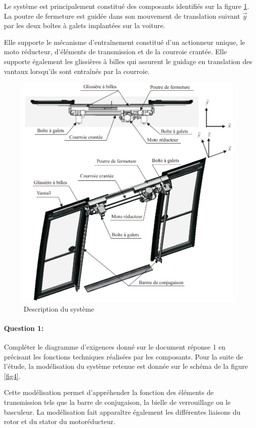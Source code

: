 Le système est principalement constitué des composants identifiés sur la figure \ref{fig3}. La poutre de fermeture est guidée dans son mouvement de translation suivant $\overrightarrow{y}$ par les deux boîtes à galets implantées sur la voiture.

Elle supporte le mécanisme d'entraînement constitué d'un actionneur unique, le moto réducteur, d'éléments de transmission et de la courroie crantée. Elle supporte également les glissières à billes qui assurent le guidage en translation des vantaux lorsqu'ils sont entraînés par la courroie.

\begin{figure}[!h]
 \centering\includegraphics[width=0.8\linewidth]{img/Portes4.png}
 \caption{Description du système}
 \label{fig3}
\end{figure}

\paragraph{Question 1:} Compléter le diagramme d'exigences donné sur le document réponse 1 en précisant les fonctions techniques réalisées par les composants. Pour la suite de l'étude, la modélisation du système retenue est donnée sur le schéma de la figure \ref{fig4}.

Cette modélisation permet d'appréhender la fonction des éléments de transmission tels que la barre de conjugaison, la bielle de verrouillage ou le basculeur. La modélisation fait apparaître également les différentes liaisons du rotor et du stator du motoréducteur.

